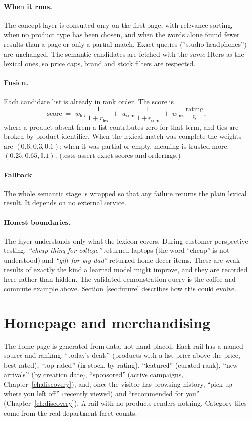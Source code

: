 \paragraph{When it runs.} The concept layer is consulted only on the first page, with relevance sorting, when no product type has been chosen, and when the words alone found fewer results than a page or only a partial match. Exact queries (``studio headphones'') are unchanged. The semantic candidates are fetched with the \emph{same} filters as the lexical ones, so price caps, brand and stock filters are respected.

\paragraph{Fusion.} Each candidate list is already in rank order. The score is
\[
\text{score} \;=\; w_{\text{lex}}\,\frac{1}{1+r_{\text{lex}}} \;+\; w_{\text{sem}}\,\frac{1}{1+r_{\text{sem}}} \;+\; w_{\text{biz}}\,\frac{\text{rating}}{5},
\]
where a product absent from a list contributes zero for that term, and ties are broken by product identifier. When the lexical match was complete the weights are $(0.6, 0.3, 0.1)$; when it was partial or empty, meaning is trusted more: $(0.25, 0.65, 0.1)$. \tagtest{} (tests assert exact scores and orderings.)

\paragraph{Fallback.} The whole semantic stage is wrapped so that any failure returns the plain lexical result. It depends on no external service.

\paragraph{Honest boundaries.} The layer understands only what the lexicon covers. During customer-perspective testing, \emph{``cheap thing for college''} returned laptops (the word ``cheap'' is not understood) and \emph{``gift for my dad''} returned home-decor items. These are weak results of exactly the kind a learned model might improve, and they are recorded here rather than hidden. The validated demonstration query is the coffee-and-commute example above. Section~\ref{sec:future} describes how this could evolve.

\section{Homepage and merchandising}

The home page is generated from data, not hand-placed. Each rail has a named source and ranking: ``today's deals'' (products with a list price above the price, best rated), ``top rated'' (in stock, by rating), ``featured'' (curated rank), ``new arrivals'' (by creation date), ``sponsored'' (active campaigns, Chapter~\ref{ch:discovery}), and, once the visitor has browsing history, ``pick up where you left off'' (recently viewed) and ``recommended for you'' (Chapter~\ref{ch:discovery}). A rail with no products renders nothing. Category tiles come from the real department facet counts. \tagimpl{}
